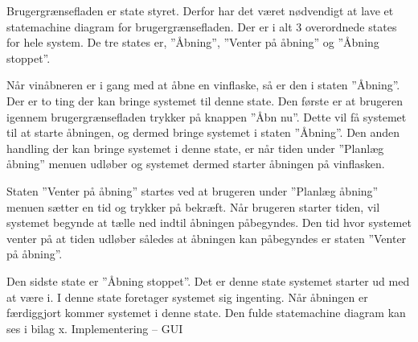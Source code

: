 Brugergrænsefladen er state styret. Derfor har det været nødvendigt at lave et statemachine diagram for brugergrænsefladen. Der er i alt 3 overordnede states for hele system. De tre states er, ”Åbning”, ”Venter på åbning” og ”Åbning stoppet”.

Når vinåbneren er i gang med at åbne en vinflaske, så er den i staten ”Åbning”. Der er to ting der kan bringe systemet til denne state. Den første er at brugeren igennem brugergrænsefladen trykker på knappen ”Åbn nu”. Dette vil få systemet til at starte åbningen, og dermed bringe systemet i staten ”Åbning”. Den anden handling der kan bringe systemet i denne state, er når tiden under ”Planlæg åbning” menuen udløber og systemet dermed starter åbningen på vinflasken. 

Staten ”Venter på åbning” startes ved at brugeren under ”Planlæg åbning” menuen sætter en tid og trykker på bekræft. Når brugeren starter tiden, vil systemet begynde at tælle ned indtil åbningen påbegyndes. Den tid hvor systemet venter på at tiden udløber således at åbningen kan påbegyndes er staten ”Venter på åbning”.

Den sidste state er ”Åbning stoppet”. Det er denne state systemet starter ud med at være i. I denne state foretager systemet sig ingenting. Når åbningen er færdiggjort kommer systemet i denne state. Den fulde statemachine diagram kan ses i bilag x. Implementering – GUI



